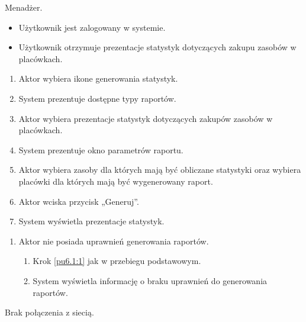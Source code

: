 Menadżer.

\begin{itemize}
\item Użytkownik jest zalogowany w systemie.
\end{itemize}

\begin{itemize}
\item Użytkownik otrzymuje prezentacje statystyk dotyczących zakupu zasobów w placówkach.
\end{itemize}

\begin{enumerate}
	\item \label{pu7.3.1:1} Aktor wybiera ikone generowania statystyk.
	\item System prezentuje dostępne typy raportów.
	\item \label{pu7.3.1:2} Aktor wybiera prezentacje statystyk dotyczących zakupów zasobów w placówkach.
	\item System prezentuje okno parametrów raportu.
	\item Aktor wybiera zasoby dla których mają być obliczane statystyki oraz wybiera placówki dla których mają być wygenerowany raport.
	\item Aktor wciska przycisk „Generuj”.
	\item System wyświetla prezentacje statystyk.
\end{enumerate}

\begin{enumerate}
	\item Aktor nie posiada uprawnień generowania raportów.
	\begin{enumerate}[label*=\arabic*.]
		\item Krok \ref{pu6.1:1} jak w przebiegu podstawowym.
		\item System wyświetla informację o braku uprawnień do generowania raportów.
	\end{enumerate}
\end{enumerate}

Brak połączenia z siecią.


